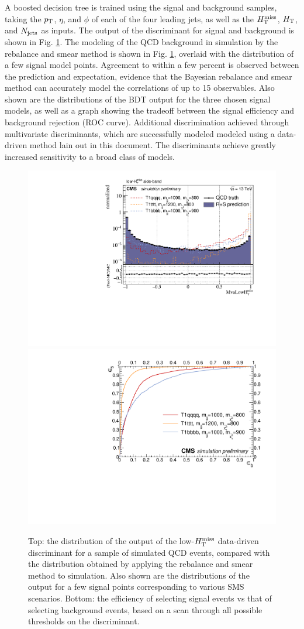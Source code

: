 A boosted decision tree is trained using the signal and background samples, taking the $p_{\text{T}}$, $\eta$, and $\phi$ of each of the four leading jets, as well as the $H_{\text{T}}^{\rm miss}$, $H_{\rm T}$, and $N_{\rm jets}$ as inputs. The output of the discriminant for signal and background is shown in Fig. \ref{fig:SusyBdt}. The modeling of the QCD background in simulation by the rebalance and smear method is shown in Fig. \ref{fig:SusyBdt}, overlaid with the distribution of a few signal model points. Agreement to within a few percent is observed between the prediction and expectation, evidence that the Bayesian rebalance and smear method can accurately model the correlations of up to 15 observables. Also shown are the distributions of the BDT output for the three chosen signal models, as well as a graph showing the tradeoff between the signal efficiency and background rejection (ROC curve). Additional discrimination achieved through multivariate discriminants, which are successfully modeled modeled using a data-driven method lain out in this document. The discriminants achieve greatly increased sensitivity to a broad class of models.
\begin{figure}[tb!]
\centering
\includegraphics[width=0.7\linewidth]{figures/SusySearches/MvaLowMht.pdf}
\includegraphics[width=0.7\linewidth]{figures/SusySearches/RocCurvesLowMht_QCDVsSUSY.pdf}
\caption{Top: the distribution of the output of the low-$H_{\text{T}}^{\rm miss}$ data-driven discriminant for a sample of simulated QCD events, compared with the distribution obtained by applying the rebalance and smear method to simulation. Also shown are the distributions of the output for a few signal points corresponding to various SMS scenarios. Bottom: the efficiency of selecting signal events vs that of selecting background events, based on a scan through all possible thresholds on the discriminant.}
\label{fig:SusyBdt}
\end{figure}

